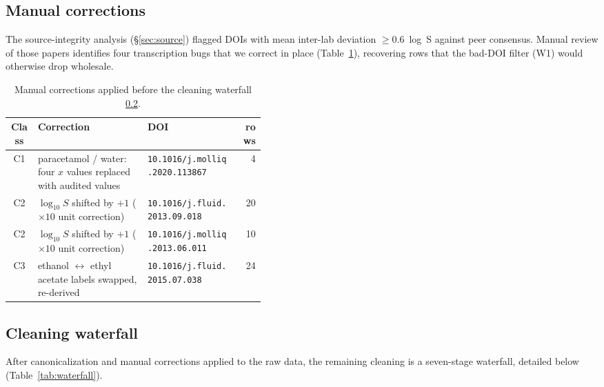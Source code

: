 \subsection{Manual corrections}
\label{sec:sergei}

The source-integrity analysis (§\ref{sec:source}) flagged  DOIs
with mean inter-lab deviation $\geq 0.6$~log~S against peer consensus.
Manual review of those papers identifies four transcription bugs that we
correct in place (Table~\ref{tab:sergei}), recovering  rows
that the bad-DOI filter (W1) would otherwise drop wholesale.

\begin{table}[h]
\centering\footnotesize
\setlength{\tabcolsep}{4pt}
\caption{Manual corrections applied before the cleaning waterfall \ref{sec:waterfall}.}
\label{tab:sergei}
\begin{tabular}{@{}c p{0.43\linewidth} l r@{}}
\toprule
Class & Correction & DOI & rows \\
\midrule
C1 & paracetamol / water: four $x$ values replaced with audited values
   & \texttt{10.1016/j.molliq.2020.113867} & 4 \\
C2 & $\log_{10} S$ shifted by $+1$ ($\times 10$ unit correction)
   & \texttt{10.1016/j.fluid.2013.09.018}  & 20 \\
C2 & $\log_{10} S$ shifted by $+1$ ($\times 10$ unit correction)
   & \texttt{10.1016/j.molliq.2013.06.011} & 10 \\
C3 & ethanol $\leftrightarrow$ ethyl acetate labels swapped, \logS{} re-derived
   & \texttt{10.1016/j.fluid.2015.07.038}  & 24 \\
\bottomrule
\end{tabular}
\end{table}

\subsection{Cleaning waterfall}
\label{sec:waterfall}

After canonicalization and manual corrections applied to the raw data, the remaining cleaning is a seven-stage waterfall, detailed below (Table~\ref{tab:waterfall}).

